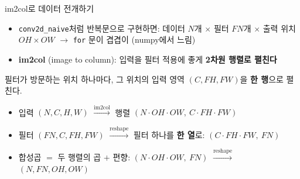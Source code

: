 \documentclass[aspectratio=169,11pt]{beamer}
\begin{document}
\begin{frame}{im2col로 데이터 전개하기}
\begin{itemize}
\item \texttt{conv2d\_naive}처럼 반복문으로 구현하면: 데이터 $N$개 $\times$ 필터 $FN$개 $\times$ 출력 위치 $OH\times OW$ $\to$ \texttt{for} 문이 겹겹이 (numpy에서 느림)
\item \textbf{im2col} (image to column): 입력을 필터 적용에 좋게 \textbf{2차원 행렬로 펼친다}
\end{itemize}
\begin{keybox}
필터가 방문하는 위치 하나마다, 그 위치의 입력 영역 $(C,FH,FW)$을 \textbf{한 행}으로 펼친다.
\begin{itemize}
\item 입력 $(N,C,H,W)$ $\xrightarrow{\text{im2col}}$ 행렬 $(N\cdot OH\cdot OW,\ C\cdot FH\cdot FW)$
\item 필터 $(FN,C,FH,FW)$ $\xrightarrow{\text{reshape}}$ 필터 하나를 \textbf{한 열}로: $(C\cdot FH\cdot FW,\ FN)$
\item 합성곱 $=$ 두 행렬의 곱 $+$ 편향: $(N\cdot OH\cdot OW,\ FN)$ $\xrightarrow{\text{reshape}}$ $(N,FN,OH,OW)$
\end{itemize}
\end{keybox}
\end{frame}
\end{document}
